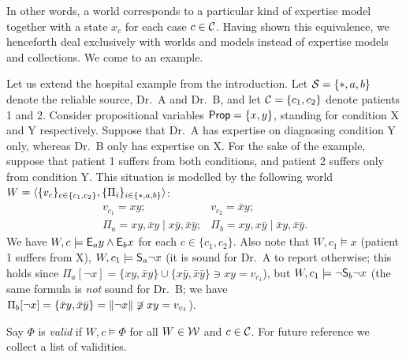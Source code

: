 In other words, a world corresponds to a particular kind of expertise model
together with a state $x_c$ for each case $c \in \C$. Having shown this
equivalence, we henceforth deal exclusively with worlds and models instead of
expertise models and collections. We come to an example.

\begin{example}
    \label{kr_ex_hospital_world}
    Let us extend the hospital example from the introduction. Let $\srcs = \{\ast,
    a, b\}$ denote the reliable source, Dr.\ A and Dr.\ B, and let $\C = \{c_1,
    c_2\}$ denote patients 1 and 2. Consider propositional variables
    $\propvars = \{x, y\}$, standing
    for condition X and Y respectively. Suppose that Dr.\ A has expertise on
    diagnosing condition Y only, whereas Dr.\ B only has expertise on X. For the
    sake of the example, suppose that patient 1 suffers from both conditions,
    and patient 2 suffers only from condition Y. This situation is modelled by
    the following world $W = \tuple{\{v_c\}_{c \in \{c_1, c_2\}}, \{\Pi_i\}_{i
    \in \{\ast, a, b\}}}$:
    \[
        \begin{array}{cc}
            v_{c_1} = xy;
            &
            v_{c_2} = \bar{x}y;
            \\
            \Pi_a = xy, \bar{x}y \mid x\bar{y}, \bar{x}\bar{y};
            &
            \Pi_b = xy, x\bar{y} \mid \bar{x}y, \bar{x}\bar{y}.
        \end{array}
    \]
    We have $W, c \models \E_a y
    \land \E_b x$ for each $c \in \{c_1, c_2\}$. Also note that $W, c_1 \models
    x$ (patient 1 suffers from X), $W, c_1 \models \S_a{\neg x}$ (it is sound
    for Dr.\ A to report otherwise; this holds since $\Pi_a[\neg x] = \{xy,
    \bar{x}y\} \cup \{x\bar{y}, \bar{x}\bar{y}\} \ni xy = v_{c_1}$), but $W,
    c_1 \models \neg \S_b{\neg x}$ (the same formula is \emph{not} sound for
    Dr.\
    B; we have $\Pi_b[\neg x] = \{\bar{x}y, \bar{x}\bar{y}\} = \propmods{\neg
    x} \not\ni xy = v_{c_1}$).
\end{example}

Say $\Phi$ is \emph{valid} if $W, c \models \Phi$ for all $W \in \W$ and $c \in \C$.
For future reference we collect a list of validities.\footnotemark{}


